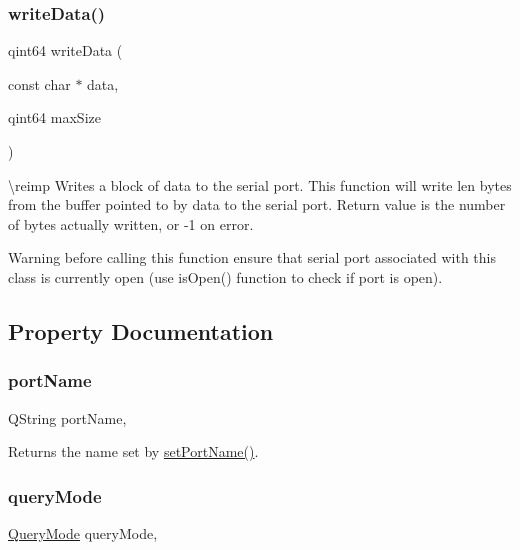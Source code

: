 \subsubsection{\texorpdfstring{writeData()}{writeData()}}
{\footnotesize\ttfamily qint64 write\+Data (\begin{DoxyParamCaption}\item[{const char $\ast$}]{data,  }\item[{qint64}]{max\+Size }\end{DoxyParamCaption})\hspace{0.3cm}{\ttfamily [protected]}}

\textbackslash{}reimp Writes a block of data to the serial port. This function will write len bytes from the buffer pointed to by data to the serial port. Return value is the number of bytes actually written, or -\/1 on error.

\begin{DoxyWarning}{Warning}
before calling this function ensure that serial port associated with this class is currently open (use is\+Open() function to check if port is open). 
\end{DoxyWarning}


\subsection{Property Documentation}
\mbox{\label{class_qext_serial_port_a541042ffa6d24b057b755ab19d128742}} 
\subsubsection{\texorpdfstring{portName}{portName}}
{\footnotesize\ttfamily Q\+String port\+Name\hspace{0.3cm}{\ttfamily [read]}, {\ttfamily [write]}}

Returns the name set by \mbox{\hyperlink{class_qext_serial_port_ae390a8f30cec40fe28b324820a494ae3}{set\+Port\+Name()}}. \mbox{\label{class_qext_serial_port_a5cc35c36e00015a1616886b3f301b2b7}} 
\subsubsection{\texorpdfstring{queryMode}{queryMode}}
{\footnotesize\ttfamily \mbox{\hyperlink{class_qext_serial_port_a269e1f3656224a10c321bd70ab89cf64}{Query\+Mode}} query\+Mode\hspace{0.3cm}{\ttfamily [read]}, {\ttfamily [write]}}


